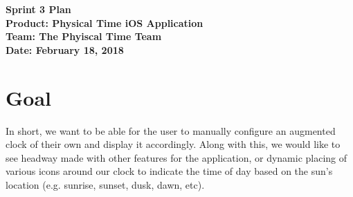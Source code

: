 \documentclass[11pt]{article}
\newcommand\tab[1][1cm]{\hspace*{#1}}
\begin{document}
	\Large{\textbf{Sprint 3 Plan}}\\
	\Large{\textbf{Product: Physical Time iOS Application}}\\
	\Large{\textbf{Team: The Phyiscal Time Team}}\\
	\Large{\textbf{Date: February 18, 2018}}\\

	\vspace{-3mm}

	\section{Goal}
		\vspace{-3mm}
		\tab \normalsize{In short, we want to be able for the user to manually configure an augmented clock of their own and display it accordingly. Along with this, we would like to see headway made with other features for the application, or dynamic placing of various icons around our clock to indicate the time of day based on the sun's location (e.g. sunrise, sunset, dusk, dawn, etc).}
\end{document}
